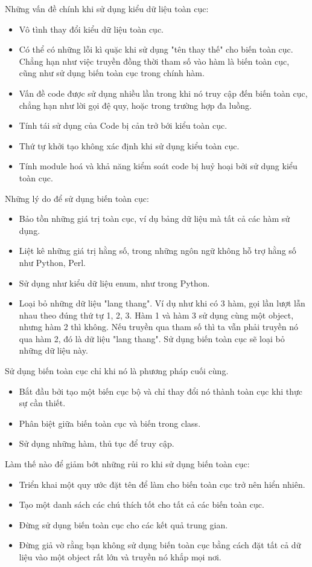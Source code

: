 \documentclass[12pt]{report}
\begin{document}
\noindent Những vấn đề chính khi sử dụng kiểu dữ liệu toàn cục: 
\begin{itemize}
	\item Vô tình thay đổi kiểu dữ liệu toàn cục.
	\item Có thể có những lỗi kì quặc khi sử dụng "tên thay thế" cho biến toàn cục. Chẳng hạn như việc truyền đồng thời tham số vào hàm là biến toàn cục, cũng như sử dụng biến toàn cục trong chính hàm. 
	\item Vấn đề code được sử dụng nhiều lần trong khi nó truy cập đến biến toàn cục, chẳng hạn như lời gọi đệ quy, hoặc trong trường hợp đa luồng. 
	\item Tính tái sử dụng của Code bị cản trở bới kiểu toàn cục. 
	\item Thứ tự khởi tạo không xác định khi sử dụng kiểu toàn cục. 
	\item Tính module hoá và khả năng kiểm soát code bị huỷ hoại bởi sử dụng kiểu toàn cục. 	
\end{itemize}

\noindent Những lý do để sử dụng biến toàn cục: 
\begin{itemize}
	\item Bảo tồn những giá trị toàn cục, ví dụ bảng dữ liệu mà tất cả các hàm sử dụng. 
	\item Liệt kê những giá trị hằng số, trong những ngôn ngữ không hỗ trợ hằng số như Python, Perl. 
	\item Sử dụng như kiểu dữ liệu enum, như trong Python. 
	\item Loại bỏ những dữ liệu "lang thang". Ví dụ như khi có 3 hàm, gọi lần lượt lẫn nhau theo đúng thứ tự 1, 2, 3.
	Hàm 1 và hàm 3 sử dụng cùng một object, nhưng hàm 2 thì không. Nếu truyền qua tham số thì ta vẫn phải truyền nó qua hàm 2, đó là dữ liệu "lang thang". Sử dụng biến toàn cục sẽ loại bỏ những dữ liệu này. 
\end{itemize}

\noindent Sử dụng biến toàn cục chỉ khi nó là phương pháp cuối cùng. 
\begin{itemize}
	\item Bắt đầu bởi tạo một biến cục bộ và chỉ thay đổi nó thành toàn cục khi thực sự cần thiết. 
	\item Phân biệt giữa biến toàn cục và biến trong class. 
	\item Sử dụng những hàm, thủ tục để truy cập.
\end{itemize}

\noindent Làm thế nào để giảm bớt những rủi ro khi sử dụng biến toàn cục:
\begin{itemize}
	\item Triển khai một quy ước đặt tên để làm cho biến toàn cục trở nên hiển nhiên. 
	\item Tạo một danh sách các chú thích tốt cho tất cả các biến toàn cục. 
	\item Đừng sử dụng biến toàn cục cho các kết quả trung gian. 
	\item Đừng giả vờ rằng bạn không sử dụng biến toàn cục bằng cách đặt tất cả dữ liệu vào một object rất lớn và truyền nó khắp mọi nơi. 
\end{itemize}
\end{document}
